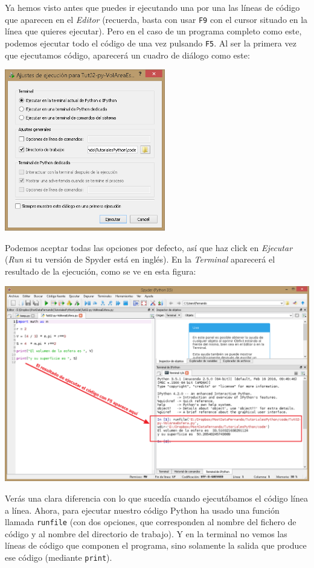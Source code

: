 \documentclass[10pt,a4paper]{article}\usepackage[]{graphicx}\usepackage[]{color}
\begin{document}
Ya hemos visto antes que puedes ir ejecutando una por una las líneas de código que aparecen en el {\em Editor} (recuerda, basta con usar {\tt F9} con el cursor situado en la línea que quieres ejecutar). Pero en el caso de un programa completo como este, podemos ejecutar todo el código de una vez pulsando {\tt F5}. Al ser la primera vez que ejecutamos código, aparecerá un cuadro de diálogo como este:
\begin{center}
\includegraphics[width=7cm]{../fig/Tut-02-py-27-SpyderDialogoEjecucion}
\end{center}
Podemos aceptar todas las opciones por defecto, así que haz click en {\em Ejecutar} ({\em Run} si tu versión de Spyder está en inglés). En la {\em Terminal} aparecerá el resultado de la ejecución, como se ve en esta figura: 
\begin{center}
\includegraphics[width=14cm]{../fig/Tut-02-py-28-SpyderResultadoF5}
\end{center}
Verás  una clara diferencia con lo que sucedía cuando ejecutábamos el código línea a línea. Ahora, para ejecutar nuestro código Python ha usado una función llamada {\tt runfile} (con dos opciones, que corresponden al nombre del fichero de código y al nombre del directorio de trabajo). Y en la terminal no vemos las líneas de código que componen el programa, sino solamente la salida que produce ese código (mediante {\tt print}). 
\end{document}
